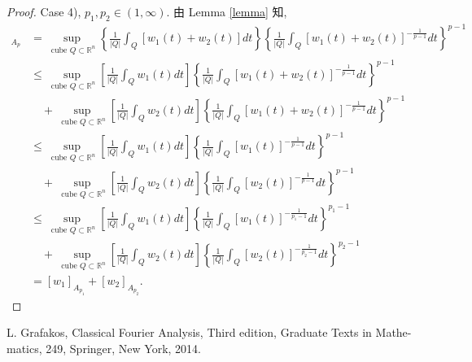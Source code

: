 \documentclass[a4paper,11pt]{article}
\theoremstyle{definition}
\begin{document}
\begin{proof}
    Case 4), $ p_1, p_2 \in (1, \infty) $. 由 Lemma \ref{lemma} 知,
    \begin{align*}
        [w_1 + w_2]_{A_p} 
            &= \sup_{\text{ cube } Q \subset \mathbb{R}^n} 
                \left\{ \frac{1}{|Q|} \int_Q [w_1(t) + w_2(t)] dt \right\}
                \left\{ \frac{1}{|Q|} \int_Q [w_1(t) + w_2(t)]^{-\frac{1}{p - 1}}dt \right\}^{p - 1} \\
            &\leq \sup_{\text{ cube } Q \subset \mathbb{R}^n} 
                \left[ \frac{1}{|Q|} \int_Q w_1(t)  dt \right]
                \left\{ \frac{1}{|Q|} \int_Q [w_1(t) + w_2(t)]^{-\frac{1}{p - 1}}dt \right\}^{p - 1} \\
                &\quad+ \sup_{\text{ cube } Q \subset \mathbb{R}^n} 
                    \left[ \frac{1}{|Q|} \int_Q w_2(t)  dt \right] 
                    \left\{ \frac{1}{|Q|} \int_Q [w_1(t) + w_2(t)]^{-\frac{1}{p - 1}}dt \right\}^{p - 1} \\
            &\leq \sup_{\text{ cube } Q \subset \mathbb{R}^n} 
                \left[ \frac{1}{|Q|} \int_Q w_1(t)  dt \right]
                \left\{ \frac{1}{|Q|} \int_Q [w_1(t)]^{-\frac{1}{p - 1}}dt \right\}^{p - 1} \\
                &\quad+ \sup_{\text{ cube } Q \subset \mathbb{R}^n} 
                    \left[ \frac{1}{|Q|} \int_Q w_2(t)  dt \right] 
                    \left\{ \frac{1}{|Q|} \int_Q [w_2(t)]^{-\frac{1}{p - 1}}dt \right\}^{p - 1} \\
            &\leq \sup_{\text{ cube } Q \subset \mathbb{R}^n} 
                \left[ \frac{1}{|Q|} \int_Q w_1(t)  dt \right]
                \left\{ \frac{1}{|Q|} \int_Q [w_1(t)]^{-\frac{1}{p_1 - 1}}dt \right\}^{p_1 - 1} \\
                &\quad+ \sup_{\text{ cube } Q \subset \mathbb{R}^n} 
                    \left[ \frac{1}{|Q|} \int_Q w_2(t)  dt \right] 
                    \left\{ \frac{1}{|Q|} \int_Q [w_2(t)]^{-\frac{1}{p_2 - 1}}dt \right\}^{p_2 - 1} \\
            &= [w_1]_{A_{p_1}} + [w_2]_{A_{p_2}}.
    \end{align*}
\end{proof}


\begin{thebibliography}{99}

      L. Grafakos, Classical Fourier Analysis, Third edition, Graduate Texts in Mathe-
    matics, 249, Springer, New York, 2014.
    
\end{thebibliography}
\end{document}
